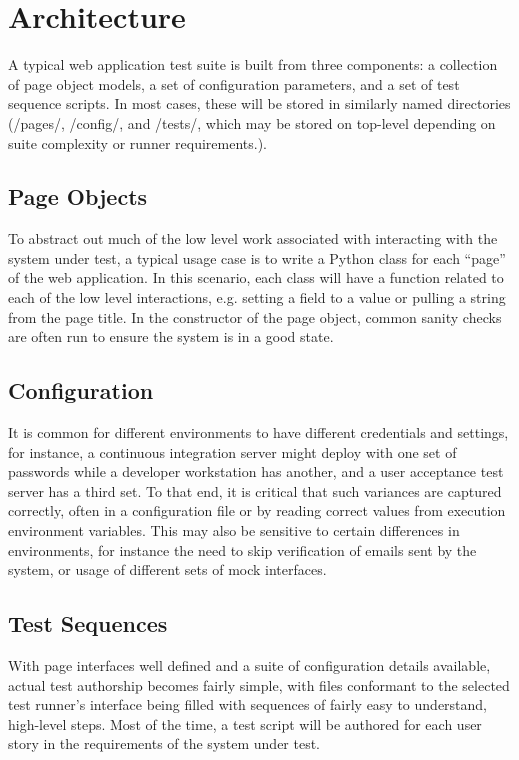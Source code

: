 \section{Architecture}
A typical web application test suite is built from three components: a collection of page object models, a set of configuration parameters, and a set of test sequence scripts. In most cases, these will be stored in similarly named directories (/pages/, /config/, and /tests/, which may be stored on top-level depending on suite complexity or runner requirements.).\citep{leotta2013improving}

\subsection{Page Objects}
To abstract out much of the low level work associated with interacting with the system under test, a typical usage case is to write a Python class for each ``page'' of the web application.\citep{kung2000object} In this scenario, each class will have a function related to each of the low level interactions, e.g. setting a field to a value or pulling a string from the page title. In the constructor of the page object, common sanity checks are often run to ensure the system is in a good state.

\subsection{Configuration}
It is common for different environments to have different credentials and settings, for instance, a continuous integration server might deploy with one set of passwords while a developer workstation has another, and a user acceptance test server has a third set. To that end, it is critical that such variances are captured correctly, often in a configuration file or by reading correct values from execution environment variables.\citep{marchetto2008state} This may also be sensitive to certain differences in environments, for instance the need to skip verification of emails sent by the system, or usage of different sets of mock interfaces.

\subsection{Test Sequences}
With page interfaces well defined and a suite of configuration details available, actual test authorship becomes fairly simple, with files conformant to the selected test runner's interface being filled with sequences of fairly easy to understand, high-level steps. Most of the time, a test script will be authored for each user story in the requirements of the system under test.

